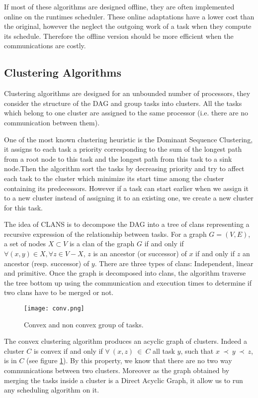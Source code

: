 \documentclass[10pt, conference, compsocconf,pdftex,usenames,dvipsnames]{IEEEtran}
\begin{document}
If most of these algorithms are designed offline, they are often implemented
online on the runtimes scheduler. These online adaptations have a lower cost
than the original, however the neglect the outgoing work of a task when they
compute its schedule. Therefore the offline version should be more efficient
when the communications are costly.

\subsection{Clustering Algorithms}

Clustering algorithms are designed for an unbounded number of processors, they
consider the structure of the DAG and group tasks into clusters. All the
tasks which belong to one cluster are assigned to the same processor (i.e. 
there are no communication between them).  

One of the most known clustering heuristic is the Dominant Sequence
Clustering\cite{yang1994dsc}, it assigns to each task a priority corresponding
to the sum of the longest path from a root node to this task and the longest
path from this task to a sink node.Then the algorithm sort the tasks by
decreasing priority and try to affect each task to the cluster which minimize
its start time among the cluster containing its predecessors. However if a
task can start earlier when we assign it to a new cluster instead of assigning
it to an existing one, we create a new cluster for this task.

The idea of CLANS
\cite{aubum1990efficient,mccreary1993partitioning,mccreary1993graph} is to
decompose the DAG into a tree of clans representing a recursive expression of
the relationship between tasks. For a graph $G=(V,E)$, a set of nodes
$X\subset V$ is a clan of the graph $G$ if and only if $\forall (x,y) \in X,
\forall z \in V-X$, $z$ is an ancestor (or successor) of $x$ if and only if
$z$ an ancestor (resp. successor) of $y$. There are three types of clans:
Independent, linear and primitive. Once the graph is decomposed into clans,
the algorithm traverse the tree bottom up using the communication and
execution times to determine if two clans have to be merged or not.

\begin{figure}[htb]
    \centering
    \texttt{[image: conv.png]}
    \caption{Convex and non convex group of tasks.}
    \label{fig:conv}
\end{figure}


The convex clustering algorithm\cite{lepere2002new} produces an acyclic graph
of clusters.  Indeed a cluster $C$ is convex if and only if $\forall\ (x,z)\
\in\ C$ all task $y$, such that $x\ \prec\ y\ \prec\ z$, is in $C$ (see
figure \ref{fig:conv}). By this property, we know that there are no two way
communications between two clusters. Moreover as the graph obtained by merging
the tasks inside a cluster is a Direct Acyclic Graph, it allow us to run
any scheduling algorithm on it.
\end{document}
